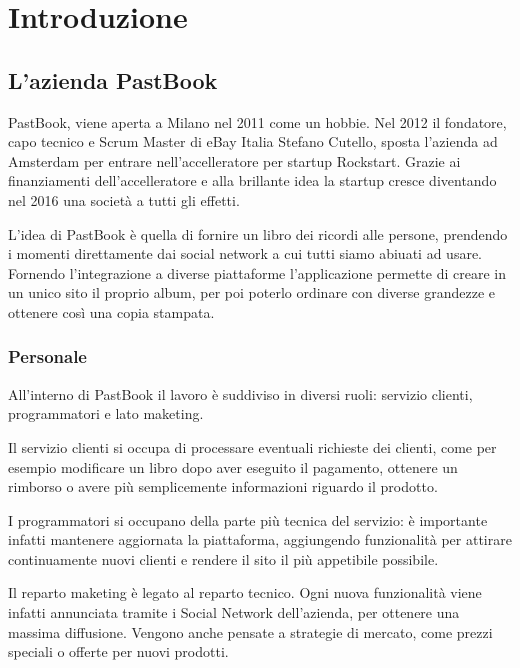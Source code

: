 \mainmatter

\chapter{Introduzione}

\section{L'azienda PastBook}

PastBook, viene aperta a Milano nel 2011 come un hobbie. Nel 2012 il fondatore,
capo tecnico e Scrum Master di eBay Italia Stefano Cutello, sposta l'azienda ad
Amsterdam per entrare nell'accelleratore per startup Rockstart. Grazie ai
finanziamenti dell'accelleratore e alla brillante idea la startup cresce
diventando nel 2016 una società a tutti gli effetti.

L'idea di PastBook è quella di fornire un libro dei ricordi alle
persone, prendendo i momenti direttamente dai social network a cui tutti siamo
abiuati ad usare. Fornendo l'integrazione a diverse piattaforme l'applicazione
permette di creare in un unico sito il proprio album, per poi
poterlo ordinare con diverse grandezze e ottenere così una copia stampata.

\subsection{Personale}

All'interno di PastBook il lavoro è suddiviso in diversi ruoli: servizio
clienti, programmatori e lato maketing.

Il servizio clienti si occupa di processare eventuali richieste dei clienti,
come per esempio modificare un libro dopo aver eseguito il pagamento, ottenere
un rimborso o avere più semplicemente informazioni riguardo il prodotto.

I programmatori si occupano della parte più tecnica del servizio: è importante
infatti mantenere aggiornata la piattaforma, aggiungendo funzionalità
per attirare continuamente nuovi clienti e rendere il sito il più appetibile
possibile.

Il reparto maketing è legato al reparto tecnico. Ogni nuova funzionalità viene
infatti annunciata tramite i Social Network dell'azienda, per ottenere una
massima diffusione. Vengono anche pensate a strategie di mercato, come prezzi
speciali o offerte per nuovi prodotti.

